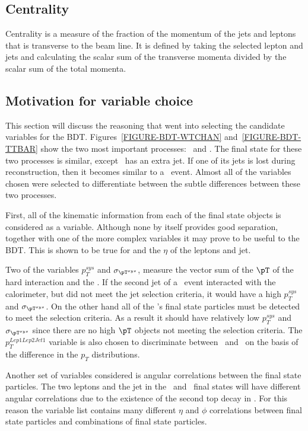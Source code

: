 \subsection{Centrality}
\label{SECTION-CENTRALITY}
Centrality is a measure of the fraction of the momentum of the jets and leptons that is transverse to the beam line. It is defined by taking the selected lepton and jets and calculating the scalar sum of the transverse momenta divided by the scalar sum of the total momenta.

\subsection{Motivation for variable choice}
\label{SECTION-OTHER}
This section will discuss the reasoning that went into selecting the candidate variables for the BDT. Figures~\ref{FIGURE-BDT-WTCHAN} and~\ref{FIGURE-BDT-TTBAR} show the two most important processes: \Wtchan\ and \ttbar. The final state for these two processes is similar, except \ttbar\ has an extra jet. If one of its jets is lost during reconstruction, then it becomes similar to a \Wtchan\ event. Almost all of the variables chosen were selected to differentiate between the subtle differences between these two processes. 

First, all of the kinematic information from each of the final state objects is considered as a variable. Although none by itself provides good separation, together with one of the more complex variables it may prove to be useful to the BDT. This is shown to be true for \MET and the $\eta$ of the leptons and jet.

Two of the variables $p_T^{sys}$ and $\sigma_{\pT^{sys}}$, measure the vector sum of the $\pT$ of the hard interaction and the \MET. If the second jet of a \ttbar\ event interacted with the calorimeter, but did not meet the jet selection criteria, it would have a high $p_T^{sys}$ and $\sigma_{\pT^{sys}}$. On the other hand all of the \Wtchan's final state particles must be detected to meet the selection criteria. As a result it should have relatively low $p_T^{sys}$ and $\sigma_{\pT^{sys}}$ since there are no high $\pT$ objects not meeting the selection criteria. The $p_T^{Lep1Lep2Jet1}$ variable is also chosen to discriminate between \Wtchan\ and \ttbar\ on the basis of the difference in the $p_T$ distributions.

Another set of variables considered is angular correlations between the final state particles. The two leptons and the jet in the \ttbar\ and \Wtchan\ final states will have different angular correlations due to the existence of the second top decay in \ttbar. For this reason the variable list contains many different $\eta$ and $\phi$ correlations between final state particles and combinations of final state particles. 

